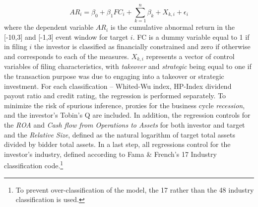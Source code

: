 \documentclass[12pt]{article}
\begin{document}
\begin{equation}
	AR_{i}=\beta_{0}+\beta_{1}FC_{i}+\sum_{k=1}^{n}\beta_{k}+X_{k,i}+\epsilon_{i}
\end{equation}
where the dependent variable $AR_{i}$ is the cumulative abnormal return in the [-10,3] and [-1,3] event window for target $i$. FC is a dummy variable equal to 1 if in filing $i$ the investor is classified as financially constrained and zero if otherwise and corresponds to each of the measures. $X_{k,i}$ represents a vector of control variables of filing characteristics, with \emph{takeover} and \emph{strategic} being equal to one if the transaction purpose was due to engaging into a takeover or strategic investment. For each classification -- Whited-Wu index, HP-Index dividend payout ratio and credit rating, the regression is performed separately. To minimize the risk of spurious inference, proxies for the business cycle \emph{recession}, and the investor's Tobin's Q are included. In addition, the regression controls for the \emph{ROA} and \emph{Cash flow from Operations to Assets} for both investor and target and the \emph{Relative Size}, defined as the natural logarithm of target total assets divided by bidder total assets. In a last step, all regressions control for the investor's industry, defined according to Fama \& French's 17 Industry classification code.\footnote{To prevent over-classification of the model, the 17 rather than the 48 industry classification is used.} 
\end{document}
